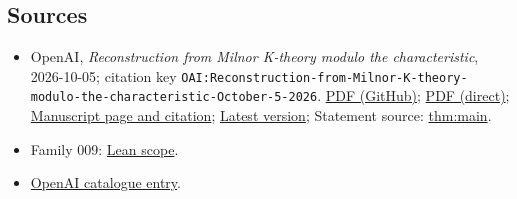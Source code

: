 \documentclass[11pt]{article}
\begin{document}
\subsection{Sources}
\begin{itemize}
\item OpenAI, \emph{Reconstruction from Milnor K-theory modulo the characteristic}, 2026-10-05; citation key \texttt{OAI:Reconstruction-from-Milnor-K-theory-modulo-the-characteristic-October-5-2026}. \href{https://github.com/openai/math/blob/adc7f1241b42e322a6451854ab7e4b4c146bf78a/preprints/Reconstruction-from-Milnor-K-theory-modulo-the-characteristic-October-5-2026/paper.pdf}{PDF (GitHub)}; \href{https://github.com/openai/math/raw/adc7f1241b42e322a6451854ab7e4b4c146bf78a/preprints/Reconstruction-from-Milnor-K-theory-modulo-the-characteristic-October-5-2026/paper.pdf}{PDF (direct)}; \href{https://github.com/openai/math/blob/adc7f1241b42e322a6451854ab7e4b4c146bf78a/preprints/Reconstruction-from-Milnor-K-theory-modulo-the-characteristic-October-5-2026/README.md}{Manuscript page and citation}; \href{https://github.com/openai/math/blob/main/preprints/Reconstruction-from-Milnor-K-theory-modulo-the-characteristic-October-5-2026/paper.pdf}{Latest version}; Statement source: \href{https://github.com/openai/math/blob/adc7f1241b42e322a6451854ab7e4b4c146bf78a/preprints/Reconstruction-from-Milnor-K-theory-modulo-the-characteristic-October-5-2026/build/build/sections/01-introduction.tex\#L41}{thm:main}.
\item Family 009: \href{https://github.com/openai/math/blob/adc7f1241b42e322a6451854ab7e4b4c146bf78a/lean/docs/009.md}{Lean scope}.
\item \href{https://github.com/openai/math/blob/adc7f1241b42e322a6451854ab7e4b4c146bf78a/CONTENTS.md}{OpenAI catalogue entry}.
\end{itemize}
\end{document}
